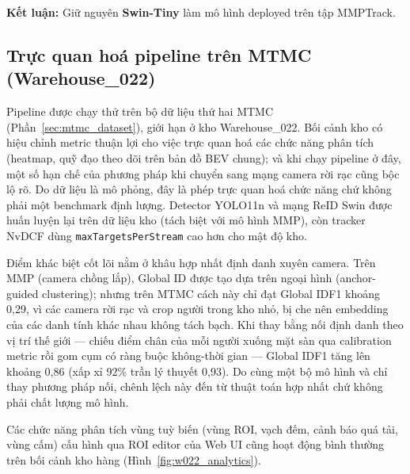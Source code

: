 \documentclass{article} %
\begin{document}
\textbf{Kết luận:} Giữ nguyên \textbf{Swin-Tiny} làm mô hình deployed trên tập MMPTrack.

\subsection{Trực quan hoá pipeline trên MTMC (Warehouse\_022)}
\label{sec:mtmc_results}

Pipeline được chạy thử trên bộ dữ liệu thứ hai MTMC (Phần~\ref{sec:mtmc_dataset}), giới hạn ở kho Warehouse\_022. Bối cảnh kho có hiệu chỉnh metric thuận lợi cho việc trực quan hoá các chức năng phân tích (heatmap, quỹ đạo theo dõi trên bản đồ BEV chung); và khi chạy pipeline ở đây, một số hạn chế của phương pháp khi chuyển sang mạng camera rời rạc cũng bộc lộ rõ. Do dữ liệu là mô phỏng, đây là phép trực quan hoá chức năng chứ không phải một benchmark định lượng. Detector YOLO11n và mạng ReID Swin được huấn luyện lại trên dữ liệu kho (tách biệt với mô hình MMP), còn tracker NvDCF dùng \texttt{maxTargetsPerStream} cao hơn cho mật độ kho.

Điểm khác biệt cốt lõi nằm ở khâu hợp nhất định danh xuyên camera. Trên MMP (camera chồng lắp), Global ID được tạo dựa trên ngoại hình (anchor-guided clustering); nhưng trên MTMC cách này chỉ đạt Global IDF1 khoảng 0,29, vì các camera rời rạc và crop người trong kho nhỏ, bị che nên embedding của các danh tính khác nhau không tách bạch. Khi thay bằng nối định danh theo vị trí thế giới --- chiếu điểm chân của mỗi người xuống mặt sàn qua calibration metric rồi gom cụm có ràng buộc không-thời gian --- Global IDF1 tăng lên khoảng 0,86 (xấp xỉ 92\% trần lý thuyết 0,93). Do cùng một bộ mô hình và chỉ thay phương pháp nối, chênh lệch này đến từ thuật toán hợp nhất chứ không phải chất lượng mô hình.

Các chức năng phân tích vùng tuỳ biến (vùng ROI, vạch đếm, cảnh báo quá tải, vùng cấm) cấu hình qua ROI editor của Web UI cũng hoạt động bình thường trên bối cảnh kho hàng (Hình~\ref{fig:w022_analytics}).
\end{document}
